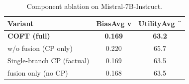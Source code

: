 \begin{table}[t]
\centering
\caption{Component ablation on Mistral-7B-Instruct.}
\label{tab:ablation-mistral-7b-instruct}
\begin{tabular}{lcc}
\toprule
Variant & BiasAvg v & UtilityAvg ^ \\
\midrule
\textbf{COFT (full)} & \textbf{0.169} & \textbf{63.2} \\
w/o fusion (CP only) & 0.220 & 65.7 \\
Single-branch CP (factual) & 0.169 & 63.5 \\
fusion only (no CP) & 0.168 & 63.5 \\
\bottomrule
\end{tabular}
\end{table}

